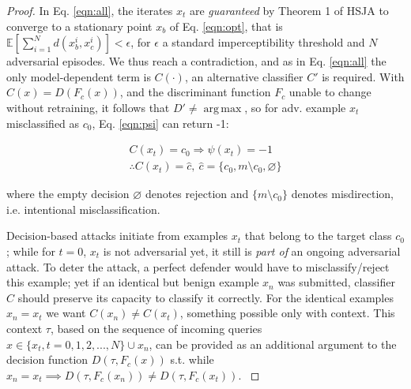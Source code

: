 \begin{proof}
In Eq. \eqref{eqn:all}, the iterates $x_t$ are \textit{guaranteed} by Theorem 1 of HSJA \cite{chen2020hopskipjumpattack} to converge to a stationary point $x_b$ of Eq. \eqref{eqn:opt}, that is $\mathbb{E}[\sum_{i=1}^{N}d(x^i_b,x^i_c)] < \epsilon$, for $\epsilon$ a standard imperceptibility threshold and $N$ adversarial episodes.
We thus reach a contradiction, and as in Eq. \eqref{eqn:all} the only model-dependent term is $C(\cdot)$, an alternative classifier $C'$ is required.
With $C(x)=D(F_c(x))$, and the discriminant function $F_c$ unable to change without retraining, it follows that $D'\neq \operatorname*{arg\,max}$, so for adv. example $x_t$ misclassified as $c_0$, Eq. \ref{eqn:psi} can return -1:


\begin{equation}
\begin{aligned}
    C(x_t) = c_0  \Rightarrow \psi(x_t) = -1 \\
    \therefore C(x_t) = \hat{c}, \: \hat{c} = \{c_0, m\setminus c_0, \varnothing\}
\end{aligned}
\end{equation}

\noindent where the empty decision $\varnothing$ denotes rejection and $\{ m\setminus c_0\}$ denotes misdirection, i.e. intentional misclassification.

Decision-based attacks initiate from examples $x_t$ that belong to the target class $c_0$; while for $t=0$, $x_t$ is not adversarial yet, it still is \textit{part of} an ongoing adversarial attack.
To deter the attack, a perfect defender would have to misclassify/reject this example; yet if an identical but benign example $x_n$ was submitted, classifier $C$ should preserve its capacity to classify it correctly.
For the identical examples $x_n = x_t$ we want $C(x_n) \neq C(x_t)$, something possible only with context.
This context $\tau$, based on the sequence of incoming queries  $x \in \{x_t, t = 0,1,2,...,N\} \cup x_n$, can be provided as an additional argument to the decision function $D(\tau, F_c(x))$ s.t. while $x_n = x_t \implies D(\tau, F_c(x_n)) \neq D(\tau, F_c(x_t)) $.
\label{prf:one}
\end{proof}


